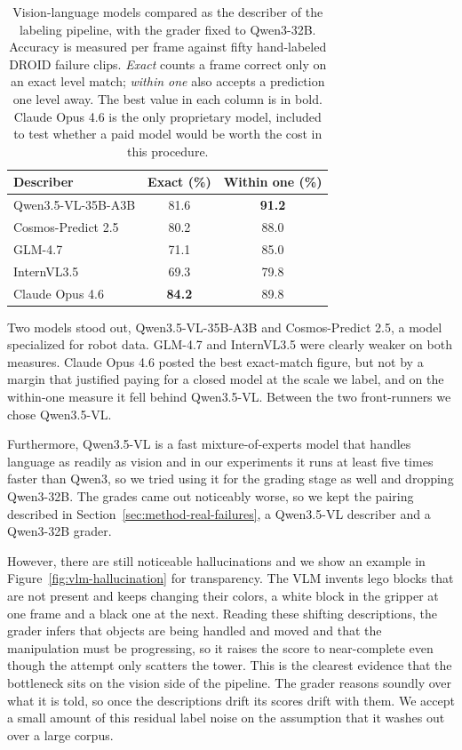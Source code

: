 \begin{table}[!ht]
\centering
\footnotesize
\caption[Describer models compared]{Vision-language models compared as the describer of the labeling pipeline, with the grader fixed to Qwen3-32B. Accuracy is measured per frame against fifty hand-labeled DROID failure clips. \emph{Exact} counts a frame correct only on an exact level match; \emph{within one} also accepts a prediction one level away. The best value in each column is in bold. Claude Opus 4.6 is the only proprietary model, included to test whether a paid model would be worth the cost in this procedure.}
\label{tab:vlm-comparison}
\begin{tabular}{@{}lcc@{}}
\toprule
Describer & Exact (\%) & Within one (\%) \\
\midrule
Qwen3.5-VL-35B-A3B \citep{team_qwen35-omni_2026} & 81.6 & \textbf{91.2} \\
Cosmos-Predict 2.5 \citep{nvidia_world_2025} & 80.2 & 88.0 \\
GLM-4.7 \citep{glm_glm-5_2026} & 71.1 & 85.0 \\
InternVL3.5 \citep{wang_internvl35_2025} & 69.3 & 79.8 \\
Claude Opus 4.6 & \textbf{84.2} & 89.8 \\
\bottomrule
\end{tabular}
\end{table}

Two models stood out, Qwen3.5-VL-35B-A3B \citep{team_qwen35-omni_2026} and Cosmos-Predict 2.5, a model specialized for robot data. GLM-4.7 and InternVL3.5 were clearly weaker on both measures. Claude Opus 4.6 posted the best exact-match figure, but not by a margin that justified paying for a closed model at the scale we label, and on the within-one measure it fell behind Qwen3.5-VL. Between the two front-runners we chose Qwen3.5-VL.

Furthermore, Qwen3.5-VL is a fast mixture-of-experts model that handles language as readily as vision and in our experiments it runs at least five times faster than Qwen3, so we tried using it for the grading stage as well and dropping Qwen3-32B. The grades came out noticeably worse, so we kept the pairing described in Section~\ref{sec:method-real-failures}, a Qwen3.5-VL describer and a Qwen3-32B grader.

However, there are still noticeable hallucinations and we show an example in Figure~\ref{fig:vlm-hallucination} for transparency. The VLM invents lego blocks that are not present and keeps changing their colors, a white block in the gripper at one frame and a black one at the next. Reading these shifting descriptions, the grader infers that objects are being handled and moved and that the manipulation must be progressing, so it raises the score to near-complete even though the attempt only scatters the tower. This is the clearest evidence that the bottleneck sits on the vision side of the pipeline. The grader reasons soundly over what it is told, so once the descriptions drift its scores drift with them. We accept a small amount of this residual label noise on the assumption that it washes out over a large corpus.

